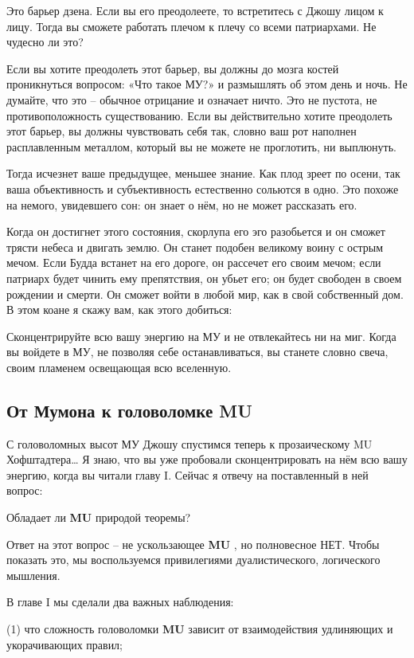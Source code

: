 \documentclass[../main.tex]{subfiles}
\begin{document}
Это барьер дзена. Если вы его преодолеете, то встретитесь с Джошу лицом к лицу. Тогда вы сможете работать плечом к плечу со всеми патриархами. Не чудесно ли это?

Если вы хотите преодолеть этот барьер, вы должны до мозга костей проникнуться вопросом: «Что такое МУ?» и размышлять об этом день и ночь. Не думайте, что это \--- обычное отрицание и означает ничто. Это не пустота, не противоположность существованию. Если вы действительно хотите преодолеть этот барьер, вы должны чувствовать себя так, словно ваш рот наполнен расплавленным металлом, который вы не можете не проглотить, ни выплюнуть.

Тогда исчезнет ваше предыдущее, меньшее знание. Как плод зреет по осени, так ваша объективность и субъективность естественно сольются в одно. Это похоже на немого, увидевшего сон: он знает о нём, но не может рассказать его.

Когда он достигнет этого состояния, скорлупа его эго разобьется и он сможет трясти небеса и двигать землю. Он станет подобен великому воину с острым мечом. Если Будда встанет на его дороге, он рассечет его своим мечом; если патриарх будет чинить ему препятствия, он убьет его; он будет свободен в своем рождении и смерти. Он сможет войти в любой мир, как в свой собственный дом. В этом коане я скажу вам, как этого добиться:

Сконцентрируйте всю вашу энергию на МУ и не отвлекайтесь ни на миг. Когда вы войдете в МУ, не позволяя себе останавливаться, вы станете словно свеча, своим пламенем освещающая всю вселенную.


\subsection{От Мумона к головоломке MU}

С головоломных высот МУ Джошу спустимся теперь к прозаическому MU Хофштадтера\ldots{} Я знаю, что вы уже пробовали сконцентрировать на нём всю вашу энергию, когда вы читали главу I. Сейчас я отвечу на поставленный в ней вопрос:

Обладает ли \textbf{MU} природой теоремы?

Ответ на этот вопрос \--- не ускользающее \textbf{MU} , но полновесное НЕТ. Чтобы показать это, мы воспользуемся привилегиями дуалистического, логического мышления.

В главе I мы сделали два важных наблюдения:

(1) что сложность головоломки \textbf{MU} зависит от взаимодействия удлиняющих и укорачивающих правил;
\end{document}
